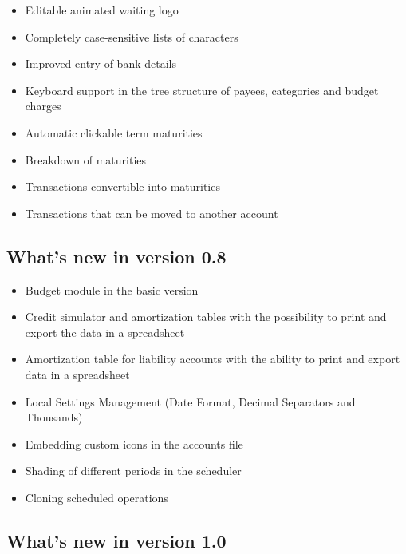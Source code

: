 \begin{itemize}
	\item Editable animated waiting logo
	\item Completely case-sensitive lists of characters
	\item Improved entry of bank details
	\item Keyboard support in the tree structure of payees, categories and budget charges
	\item Automatic clickable term maturities
	\item Breakdown of maturities
	\item Transactions convertible into maturities
	\item Transactions that can be moved to another account
\end{itemize}

\subsection{What's new in version 0.8}

\begin{itemize}
	\item Budget module in the basic version
	\item Credit simulator and amortization tables with the possibility to print and export the data in a spreadsheet
	\item Amortization table for liability accounts with the ability to print and export data in a spreadsheet
	\item Local Settings Management (Date Format, Decimal Separators and Thousands)
	\item Embedding custom icons in the accounts file
	\item Shading of different periods in the scheduler
	\item Cloning scheduled operations
\end{itemize}


\newpage

\subsection{What's new in version 1.0}


